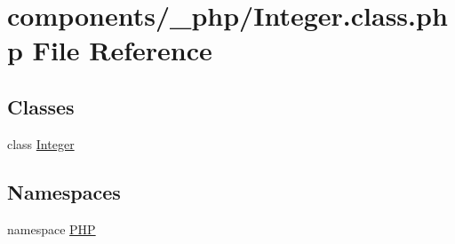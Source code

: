 \hypertarget{_integer_8class_8php}{
\section{components/\_\-php/Integer.class.php File Reference}
\label{_integer_8class_8php}
}
\subsection*{Classes}
\begin{CompactItemize}
\item 
class \hyperlink{class_integer}{Integer}
\end{CompactItemize}
\subsection*{Namespaces}
\begin{CompactItemize}
\item 
namespace \hyperlink{namespace_p_h_p}{PHP}
\end{CompactItemize}
